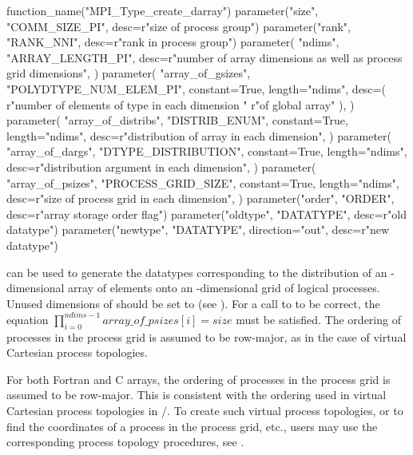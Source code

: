 \begin{mpi-binding}
    function_name("MPI_Type_create_darray")
    parameter("size", "COMM_SIZE_PI", desc=r"size of process group")
    parameter("rank", "RANK_NNI", desc=r"rank in process group")
    parameter(
        "ndims",
        "ARRAY_LENGTH_PI",
        desc=r"number of array dimensions as well as process grid dimensions",
    )
    parameter(
        "array_of_gsizes",
        "POLYDTYPE_NUM_ELEM_PI",
        constant=True,
        length="ndims",
        desc=(
            r"number of elements of type  in each dimension "
            r"of global array"
        ),
    )
    parameter(
        "array_of_distribs",
        "DISTRIB_ENUM",
        constant=True,
        length="ndims",
        desc=r"distribution of array in each dimension",
    )
    parameter(
        "array_of_dargs",
        "DTYPE_DISTRIBUTION",
        constant=True,
        length="ndims",
        desc=r"distribution argument in each dimension",
    )
    parameter(
        "array_of_psizes",
        "PROCESS_GRID_SIZE",
        constant=True,
        length="ndims",
        desc=r"size of process grid in each dimension",
    )
    parameter("order", "ORDER", desc=r"array storage order flag")
    parameter("oldtype", "DATATYPE", desc=r"old datatype")
    parameter("newtype", "DATATYPE", direction="out", desc=r"new datatype")
\end{mpi-binding}

 can be used to generate
the datatypes corresponding to the distribution
of an -dimensional array of  elements
onto
an -dimensional grid of logical processes.
Unused dimensions of  should be set to 
(see ).
For a call to  to be correct,
the equation \( \prod_{i=0}^{ndims-1} array\_of\_psizes[i] = size \)
must be satisfied.
The ordering of processes in the process grid is assumed to be
row-major, as in the case of virtual Cartesian process topologies.
\begin{users}
For both Fortran and C arrays, the ordering of processes in the
process grid is assumed to be row-major. This is consistent with the
ordering used in virtual Cartesian process topologies in
\MPI/.
To create such virtual process topologies, or to find the coordinates
of a process in the process grid, etc., users may use the corresponding
process topology procedures,
see .
\end{users}


